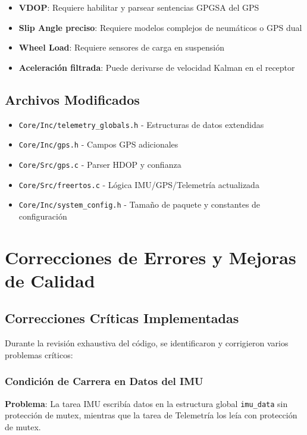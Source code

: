\documentclass[11pt,a4paper]{article}
\begin{document}
\begin{itemize}
    \item \textbf{VDOP}: Requiere habilitar y parsear sentencias GPGSA del GPS
    \item \textbf{Slip Angle preciso}: Requiere modelos complejos de neumáticos o GPS dual
    \item \textbf{Wheel Load}: Requiere sensores de carga en suspensión
    \item \textbf{Aceleración filtrada}: Puede derivarse de velocidad Kalman en el receptor
\end{itemize}

\subsection{Archivos Modificados}

\begin{itemize}
    \item \texttt{Core/Inc/telemetry\_globals.h} - Estructuras de datos extendidas
    \item \texttt{Core/Inc/gps.h} - Campos GPS adicionales
    \item \texttt{Core/Src/gps.c} - Parser HDOP y confianza
    \item \texttt{Core/Src/freertos.c} - Lógica IMU/GPS/Telemetría actualizada
    \item \texttt{Core/Inc/system\_config.h} - Tamaño de paquete y constantes de configuración
\end{itemize}

\newpage
\section{Correcciones de Errores y Mejoras de Calidad}

\subsection{Correcciones Críticas Implementadas}

Durante la revisión exhaustiva del código, se identificaron y corrigieron varios problemas críticos:

\subsubsection{Condición de Carrera en Datos del IMU}

\textbf{Problema}: La tarea IMU escribía datos en la estructura global \texttt{imu\_data} sin protección de mutex, mientras que la tarea de Telemetría los leía con protección de mutex.
\end{document}
